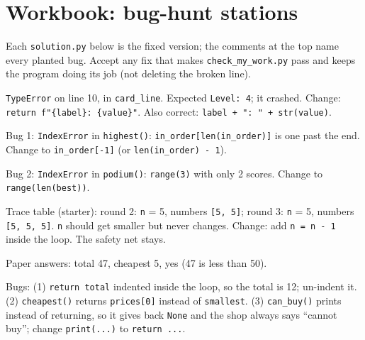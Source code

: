 
\section{Workbook: bug-hunt stations}
Each \texttt{solution.py} below is the fixed version; the comments at the top name every planted bug.
Accept any fix that makes \texttt{check\_my\_work.py} pass and keeps the program doing its job (not deleting the broken line).

\begin{answer}
\texttt{TypeError} on line 10, in \texttt{card\_line}. Expected \texttt{Level: 4}; it crashed. Change: \texttt{return f"\{label\}: \{value\}"}.
Also correct: \texttt{label + ": " + str(value)}.
\end{answer}

\begin{answer}
Bug 1: \texttt{IndexError} in \texttt{highest()}: \texttt{in\_order[len(in\_order)]} is one past the end. Change to \texttt{in\_order[-1]}
(or \texttt{len(in\_order) - 1}).\par
Bug 2: \texttt{IndexError} in \texttt{podium()}: \texttt{range(3)} with only 2 scores. Change to \texttt{range(len(best))}.
\end{answer}

\begin{answer}
Trace table (starter): round 2: \texttt{n} = 5, numbers \texttt{[5, 5]}; round 3: \texttt{n} = 5, numbers \texttt{[5, 5, 5]}.
\texttt{n} should get smaller but never changes. Change: add \texttt{n = n - 1} inside the loop. The safety net stays.
\end{answer}

\begin{answer}
Paper answers: total 47, cheapest 5, yes (47 is less than 50).\par
Bugs: (1) \texttt{return total} indented inside the loop, so the total is 12; un-indent it. (2) \texttt{cheapest()} returns \texttt{prices[0]}
instead of \texttt{smallest}. (3) \texttt{can\_buy()} prints instead of returning, so it gives back \texttt{None} and the shop always says
\enquote{cannot buy}; change \texttt{print(...)} to \texttt{return ...}.
\end{answer}

